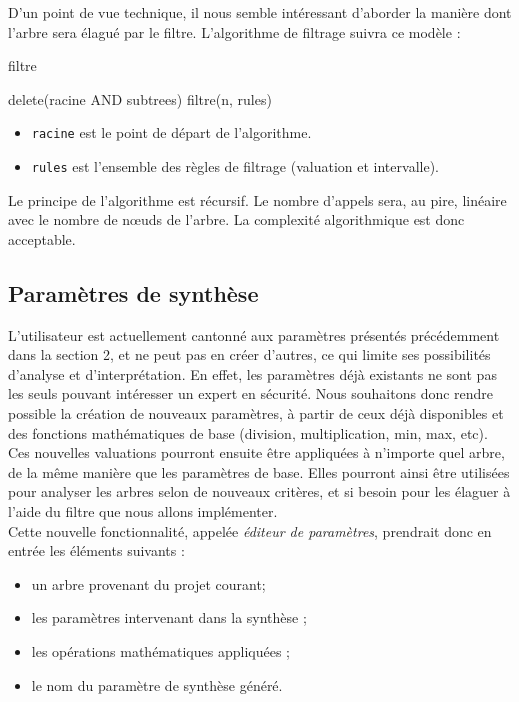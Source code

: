 		D'un point de vue technique, il nous semble intéressant d'aborder la manière dont l'arbre sera élagué par le filtre.
		L'algorithme de filtrage suivra ce modèle :

		\begin{algorithm}[h!]
			\caption{filtre}
		\begin{algorithmic}
						\STATE delete(racine AND subtrees)
						\RETURN
					\ENDIF
				\ENDFOR
					\STATE filtre(n, rules)
				\ENDFOR

		\end{algorithmic}
		\end{algorithm}

		\begin{itemize}
		 \item \verb|racine| est le point de départ de l'algorithme.
		 \item \verb|rules| est l'ensemble des règles de filtrage (valuation et intervalle).
		\end{itemize}
	
		Le principe de l'algorithme est récursif.
		Le nombre d'appels sera, au pire, linéaire avec le nombre de nœuds de l'arbre.
		La complexité algorithmique est donc acceptable.

		\subsection{Paramètres de synthèse}
		\label{subsection:synthese} 

			L'utilisateur est actuellement cantonné aux paramètres présentés précédemment dans la section 2, et ne peut pas en créer d'autres, ce qui limite ses possibilités d'analyse et d'interprétation. En effet, les paramètres déjà existants ne sont pas les seuls pouvant intéresser un expert en sécurité. Nous souhaitons donc rendre possible la création de nouveaux paramètres, à partir de ceux déjà disponibles et des fonctions mathématiques de base (division, multiplication, min, max, etc). Ces nouvelles valuations pourront ensuite être appliquées à n'importe quel arbre, de la même manière que les paramètres de base. Elles pourront ainsi être utilisées pour analyser les arbres selon de nouveaux critères, et si besoin pour les élaguer à l'aide du filtre que nous allons implémenter.\\

			Cette nouvelle fonctionnalité, appelée \emph{éditeur de paramètres}, prendrait donc en entrée les éléments suivants :
			\begin{itemize}
				\item un arbre provenant du projet courant; %
				\item les paramètres intervenant dans la synthèse ;
				\item les opérations mathématiques appliquées ;
				\item le nom du paramètre de synthèse généré.
			\end{itemize}


